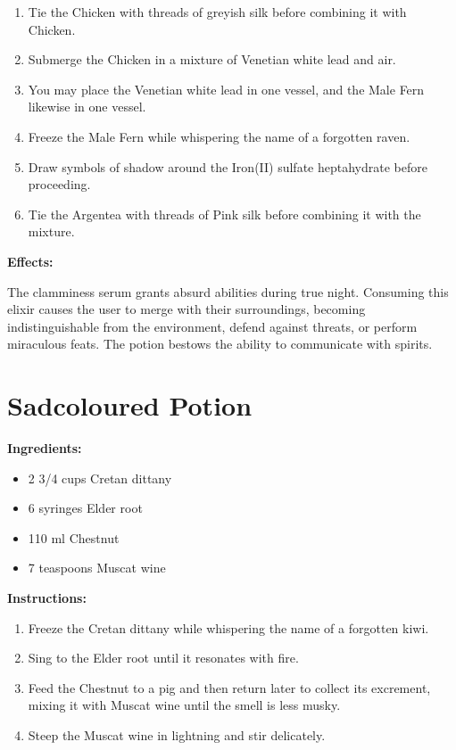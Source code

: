 \documentclass{article}
\begin{document}
\begin{enumerate}
  \item Tie the Chicken with threads of greyish silk before combining it with Chicken.
  \item Submerge the Chicken in a mixture of Venetian white lead and air.
  \item You may place the Venetian white lead in one vessel, and the Male Fern likewise in one vessel.
  \item Freeze the Male Fern while whispering the name of a forgotten raven.
  \item Draw symbols of shadow around the Iron(II) sulfate heptahydrate before proceeding.
  \item Tie the Argentea with threads of Pink silk before combining it with the mixture.
\end{enumerate}

\textbf{Effects:}

The clamminess serum grants absurd abilities during true night. Consuming this elixir causes the user to merge with their surroundings, becoming indistinguishable from the environment, defend against threats, or perform miraculous feats. The potion bestows the ability to communicate with spirits.

\newpage
\section*{Sadcoloured Potion}

\textbf{Ingredients:}

\begin{itemize}
  \item 2 3/4 cups Cretan dittany
  \item 6 syringes Elder root
  \item 110 ml Chestnut
  \item 7 teaspoons Muscat wine
\end{itemize}

\textbf{Instructions:}

\begin{enumerate}
  \item Freeze the Cretan dittany while whispering the name of a forgotten kiwi.
  \item Sing to the Elder root until it resonates with fire.
  \item Feed the Chestnut to a pig and then return later to collect its excrement, mixing it with Muscat wine until the smell is less musky.
  \item Steep the Muscat wine in lightning and stir delicately.
\end{enumerate}
\end{document}
